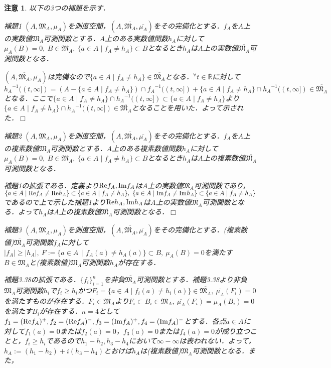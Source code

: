 \documentclass[a4paper,11pt]{jsarticle}
\def\qed{\hfill $\Box$}
\newtheorem{attention}{注意}
\begin{document}
\begin{attention}
以下の3つの補題を示す．
\begin{itembox}[l]{補題1}
$(A,\mathfrak{M}_A,\mu_A)$を測度空間，$(A,\overline{\mathfrak{M}_A},\overline{\mu_A})$をその完備化とする．$f_A$を$A$上の実数値$\mathfrak{M}_A$可測関数とする．$A$上のある実数値関数$h_A$に対して$\mu_A(B)=0,{\ }B\in\mathfrak{M}_A,{\ }\{a\in A \mid f_A\neq h_A\}\subset B$となるとき$h_A$は$A$上の実数値$\overline{\mathfrak{M}_A}$可測関数となる．
\end{itembox}
$(A,\overline{\mathfrak{M}_A},\overline{\mu_A})$は完備なので$\{a\in A \mid f_A\neq h_A\}\in \overline{\mathfrak{M}_A}$となる．$^\forall t\in \bar{\mathbb{R}}$に対して${h_A}^{-1}((t,\infty])=(A-\{a\in A \mid f_A\neq h_A\})\cap {f_A}^{-1}((t,\infty])+\{a\in A \mid f_A\neq h_A\}\cap {h_A}^{-1}((t,\infty])\in \overline{\mathfrak{M}_A}$となる．ここで$\{a\in A \mid f_A\neq h_A\}\cap {h_A}^{-1}((t,\infty])\subset\{a\in A \mid f_A\neq h_A\}$より$\{a\in A \mid f_A\neq h_A\}\cap {h_A}^{-1}((t,\infty])\in\overline{\mathfrak{M}_A}$となることを用いた．よって示された．\qed
\begin{itembox}[l]{補題2}
$(A,\mathfrak{M}_A,\mu_A)$を測度空間，$(A,\overline{\mathfrak{M}_A},\overline{\mu_A})$をその完備化とする．$f_A$を$A$上の複素数値$\mathfrak{M}_A$可測関数とする．$A$上のある複素数値関数$h_A$に対して$\mu_A(B)=0,{\ }B\in\mathfrak{M}_A,{\ }\{a\in A \mid f_A\neq h_A\}\subset B$となるとき$h_A$は$A$上の複素数値$\overline{\mathfrak{M}_A}$可測関数となる．
\end{itembox}
補題1の拡張である．定義より${\rm Re}f_A,{\rm Im}f_A$は$A$上の実数値$\mathfrak{M}_A$可測関数であり，$\{a\in A \mid {\rm Re}f_A\neq {\rm Re}h_A\}\subset \{a\in A \mid f_A\neq h_A\},{\ }\{a\in A \mid {\rm Im}f_A\neq {\rm Im}h_A\}\subset \{a\in A \mid f_A\neq h_A\}$であるので上で示した補題1より${\rm Re}h_A,{\rm Im}h_A$は$A$上の実数値$\overline{\mathfrak{M}_A}$可測関数となる．よって$h_A$は$A$上の複素数値$\overline{\mathfrak{M}_A}$可測関数となる．\qed
\begin{itembox}[l]{補題3}
$(A,\mathfrak{M}_A,\mu_A)$を測度空間，$(A,\overline{\mathfrak{M}_A},\overline{\mu_A})$をその完備化とする．(複素数値)$\overline{\mathfrak{M}_A}$可測関数$f_A$に対して$|f_A|\geq |h_A|,{\ }F:=\{a\in A\ \mid f_A(a)\neq h_A(a)\} \subset B,{\ }\mu_A(B)=0$を満たす$B\in \mathfrak{M}_A$と(複素数値)$\mathfrak{M}_A$可測関数$h_A$が存在する．
\end{itembox}
補題3.38の拡張である．$\{f_i\}_{i=1}^n$を非負$\overline{\mathfrak{M}_A}$可測関数とする．補題3.38より非負$\mathfrak{M}_A$可測関数$h_i$で$f_i\geq h_i$かつ$F_i=\{a\in A \mid f_i(a)\neq h_i(a)\}\in \overline{\mathfrak{M}_A},{\ }\overline{\mu_A}(F_i)=0$を満たすものが存在する．$F_i\in \overline{\mathfrak{M}_A}$より$F_i\subset B_i\in \mathfrak{M}_A,{\ }\overline{\mu_A}(F_i)=\mu_A(B_i)=0$を満たす$B_i$が存在する．$n=4$として$f_1=({\rm Re}f_A)^+,f_2=({\rm Re}f_A)^-,f_3=({\rm Im}f_A)^+,f_4=({\rm Im}f_A)^-$とする．各点$a\in A$に対して$f_1(a)=0$または$f_2(a)=0$，$f_3(a)=0$または$f_4(a)=0$が成り立つことと，$f_i\geq h_i$であるので$h_1-h_2,h_3-h_4$において$\infty-\infty$は表われない．よって，$h_A:=(h_1-h_2)+i(h_3-h_4)$とおけば$h_A$は(複素数値)$\mathfrak{M}_A$可測関数となる．また，

\end{attention}
\end{document}
